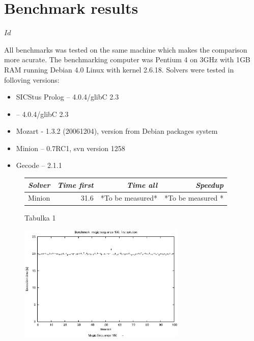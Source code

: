 \chapter{Benchmark results}

\begin{svn_verze}
$Id$
\end{svn_verze}

All benchmarks was tested on the same machine which makes the comparison more 
acurate. The benchmarking computer was Pentium 4 on 3GHz with 1GB RAM running
Debian 4.0 Linux with kernel 2.6.18. Solvers were tested in folloving versions:
\begin{itemize}
\item SICStus Prolog -- 4.0.4/glibC 2.3
\item \eclipse -- 4.0.4/glibC 2.3
\item Mozart - 1.3.2 (20061204), version from Debian packages system 
\item Minion -- 0.7RC1, svn version 1258
\item Gecode -- 2.1.1
\end{itemize}

\begin{figure}[Table]
\caption{Tabulka 1}
\begin{tabular}{lrrr}
\hline \itshape Solver	&	 \itshape Time first	&	\itshape Time all & \itshape Speedup \\
\hline Minion	&	 31.6 & *To be measured* & *To be measured * \\
\hline
\end{tabular}
\end{figure}

\begin{figure}
\begin{center}
\includegraphics[width=8cm]{images/grafy/100magic.eps}
\end{center}
\end{figure} 
